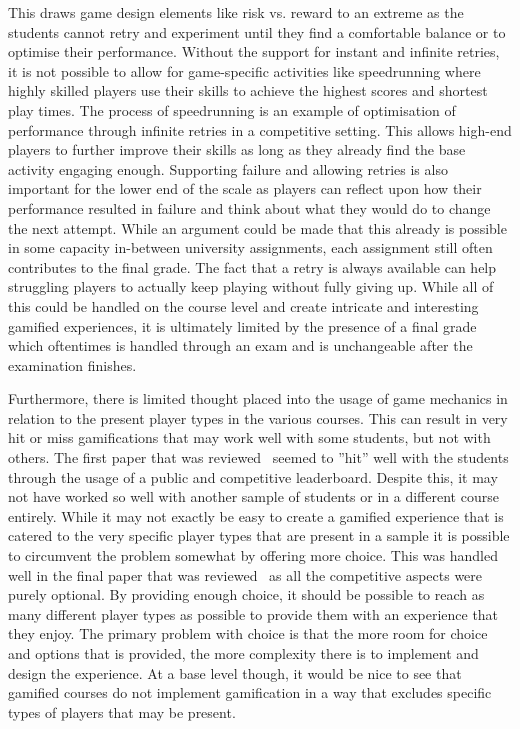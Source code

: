This draws game design elements like risk vs. reward to an extreme as the students cannot retry and experiment until they find a comfortable balance or to optimise their performance. Without the support for instant and infinite retries, it is not possible to allow for game-specific activities like speedrunning where highly skilled players use their skills to achieve the highest scores and shortest play times. The process of speedrunning is an example of optimisation of performance through infinite retries in a competitive setting. This allows high-end players to further improve their skills as long as they already find the base activity engaging enough. Supporting failure and allowing retries is also important for the lower end of the scale as players can reflect upon how their performance resulted in failure and think about what they would do to change the next attempt. While an argument could be made that this already is possible in some capacity in-between university assignments, each assignment still often contributes to the final grade. The fact that a retry is always available can help struggling players to actually keep playing without fully giving up. While all of this could be handled on the course level and create intricate and interesting gamified experiences, it is ultimately limited by the presence of a final grade which oftentimes is handled through an exam and is unchangeable after the examination finishes. 


Furthermore, there is limited thought placed into the usage of game mechanics in relation to the present player types in the various courses. This can result in very hit or miss gamifications that may work well with some students, but not with others. The first paper that was reviewed~\cite{panagiotis2016climbing} seemed to ''hit'' well with the students through the usage of a public and competitive leaderboard. Despite this, it may not have worked so well with another sample of students or in a different course entirely. While it may not exactly be easy to create a gamified experience that is catered to the very specific player types that are present in a sample it is possible to circumvent the problem somewhat by offering more choice. This was handled well in the final paper that was reviewed~\cite{mozelius2014game} as all the competitive aspects were purely optional. By providing enough choice, it should be possible to reach as many different player types as possible to provide them with an experience that they enjoy. The primary problem with choice is that the more room for choice and options that is provided, the more complexity there is to implement and design the experience. At a base level though, it would be nice to see that gamified courses do not implement gamification in a way that excludes specific types of players that may be present.